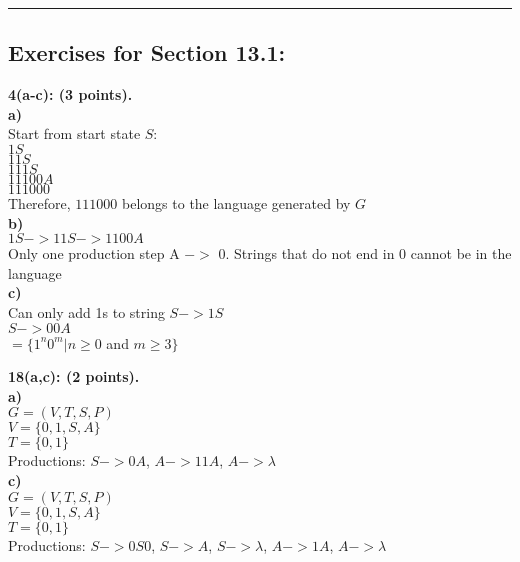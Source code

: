 \documentclass[12pt]{article}  %
\begin{document}
\rule{6in}{.1pt}       %


\subsection*{Exercises for Section 13.1:}     

\noindent
{\bf 4(a-c): (3 points).} \\
{\bf a)}\\
Start from start state $S$:\\
$1S$\\
$11S$\\
$111S$\\
$11100A$\\
$111000$\\
Therefore, $111000$ belongs to the language generated by $G$\\
{\bf b)}\\
$1S -> 11S -> 1100A$\\
Only one production step A $->$ 0. Strings that do not end in 0 cannot be in the language\\
{\bf c)}\\
Can only add 1s to string $S -> 1S$\\
$S-> 00A$\\
$= \{1^n 0^m | n \geq 0$ and $m \geq 3\}$


\noindent
{\bf 18(a,c): (2 points).} \\
{\bf a)}\\
$G = (V,T,S,P)$\\
$V = \{0,1,S,A\}$\\
$T = \{0,1\}$\\
Productions:
$S->0A$, $A->11A$, $A->\lambda$\\
{\bf c)}\\
$G = (V,T,S,P)$\\
$V = \{0,1,S,A\}$\\
$T = \{0,1\}$\\
Productions:
$S->0S0$, $S->A$, $S->\lambda$, $A->1A$, $A->\lambda$\\
\end{document}
